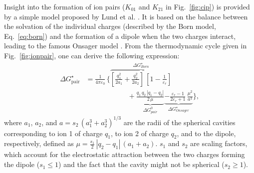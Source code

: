 \documentclass[review,preprint]{elsarticle}
\begin{document}
Insight into the formation of ion pairs ($K_{01}$ and $K_{21}$ in Fig.~\ref{fig:cip}) is provided by a simple model proposed by Lund et al. \cite{lundDielectricInterpretationSpecificity2010}. It is based on the balance between the solvation of the individual charges (described by the Born model, Eq.~\eqref{eq:born}) and the formation of a dipole when the two charges interact, leading to the famous Onsager model \cite{onsagerElectricMomentsMolecules1936,krishtalikElectrostaticIonSolvent1991,aubretUnderstandingLocalField2019}. From the thermodynamic cycle given in Fig.~\ref{fig:ionpair}, one can derive the following expression: \begin{align}
	\Delta G_{\text{pair}}^\star &= \frac{1}{4\pi\varepsilon_0}\,\bigg\{\overbrace{\left[\frac{q_1^2}{2a_1}+\frac{q_2^2}{2a_2}\right]\,\left[1-\frac{1}{\varepsilon_r}\right]}^{\Delta G^\star_{Born}}\nonumber\\
	&\hspace{6em}+\underbrace{\frac{q_1\,q_2\,|q_1-q_2|}{2\,\mu}}_{\Delta G^0_{pair}}\underbrace{-\frac{\varepsilon_r-1}{2\varepsilon_r+1}\,\frac{\mu^2}{a^3}}_{\Delta G^\star_{Onsager}}\bigg\},\label{eq:pair}
\end{align}
where $a_1$, $a_2$, and $a=s_2\,( a_1^3+a_2^3)^{1/3}$ are the radii of the spherical cavities corresponding to ion 1 of charge $q_1$, to ion 2 of charge $q_2$, and to the dipole, respectively, defined as $\mu = \frac{s_1}{2}\,|q_2-q_1|\,(a_1+a_2)$.  $s_1$ and $s_2$ are scaling factors, which account for the electrostatic attraction between the two charges forming the dipole ($s_1\leq 1$) and the fact that the cavity might not be spherical ($s_2\geq 1$).
\end{document}
